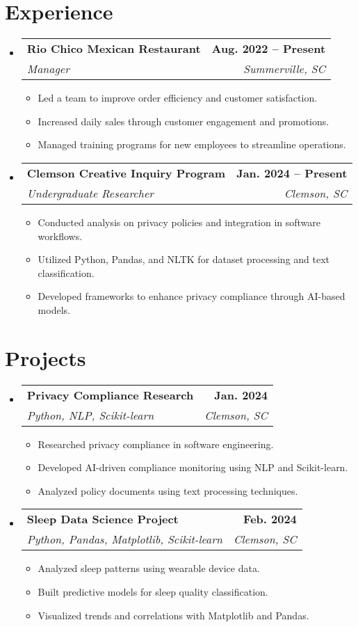 \documentclass[letterpaper,11pt]{article}
\makeatletter
\newcommand{\resumeSubheading}[4]{
  \vspace{-2pt}\item[]
    \begin{tabular*}{1.0\textwidth}[t]{l@{\extracolsep{\fill}}r}
      \textbf{#1} & \textbf{\small #2} \\
      \textit{\small#3} & \textit{\small #4} \\
    \end{tabular*}\vspace{-7pt}
}
\makeatother
\begin{document}
\section{Experience}
\begin{itemize}
    \resumeSubheading{Rio Chico Mexican Restaurant}{Aug. 2022 -- Present}{Manager}{Summerville, SC}
    \begin{itemize}
        \item Led a team to improve order efficiency and customer satisfaction.
        \item Increased daily sales through customer engagement and promotions.
        \item Managed training programs for new employees to streamline operations.
    \end{itemize}

    \resumeSubheading{Clemson Creative Inquiry Program}{Jan. 2024 -- Present}{Undergraduate Researcher}{Clemson, SC}
    \begin{itemize}
        \item Conducted analysis on privacy policies and integration in software workflows.
        \item Utilized Python, Pandas, and NLTK for dataset processing and text classification.
        \item Developed frameworks to enhance privacy compliance through AI-based models.
    \end{itemize}
\end{itemize}


\section{Projects}
\begin{itemize}
    \resumeSubheading{Privacy Compliance Research}{Jan. 2024}{Python, NLP, Scikit-learn}{Clemson, SC}
    \begin{itemize}
        \item Researched privacy compliance in software engineering.
        \item Developed AI-driven compliance monitoring using NLP and Scikit-learn.
        \item Analyzed policy documents using text processing techniques.
    \end{itemize}

    \resumeSubheading{Sleep Data Science Project}{Feb. 2024}{Python, Pandas, Matplotlib, Scikit-learn}{Clemson, SC}
    \begin{itemize}
        \item Analyzed sleep patterns using wearable device data.
        \item Built predictive models for sleep quality classification.
        \item Visualized trends and correlations with Matplotlib and Pandas.
    \end{itemize}
\end{itemize}
\end{document}
